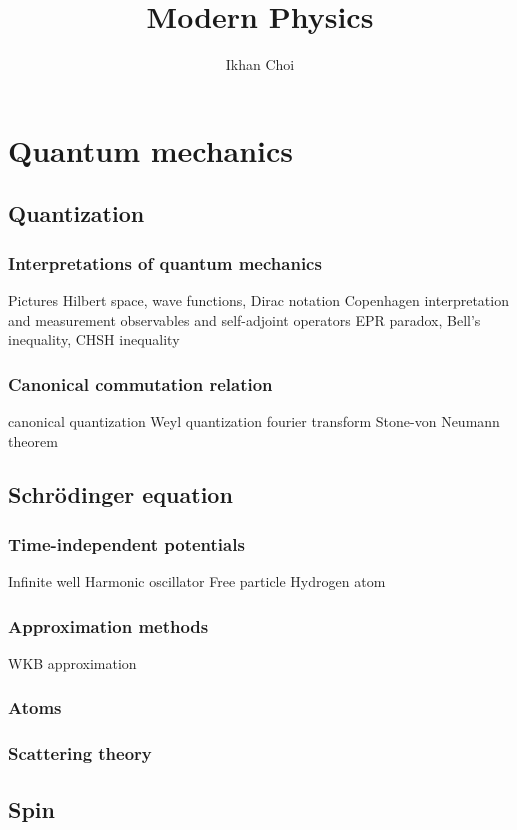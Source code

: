 \documentclass{../../large}
\begin{document}
\title{Modern Physics}
\author{Ikhan Choi}
\maketitle
\tableofcontents

\part{Quantum mechanics}
\chapter{Quantization}
\section{Interpretations of quantum mechanics}
Pictures
Hilbert space, wave functions, Dirac notation
Copenhagen interpretation and measurement
observables and self-adjoint operators
EPR paradox, Bell's inequality, CHSH inequality
\section{Canonical commutation relation}
canonical quantization
Weyl quantization
fourier transform
Stone-von Neumann theorem

\chapter{Schr\"odinger equation}
\section{Time-independent potentials}
Infinite well
Harmonic oscillator
Free particle
Hydrogen atom
\section{Approximation methods}
WKB approximation
\section{Atoms}
\section{Scattering theory}

\chapter{Spin}
\end{document}
